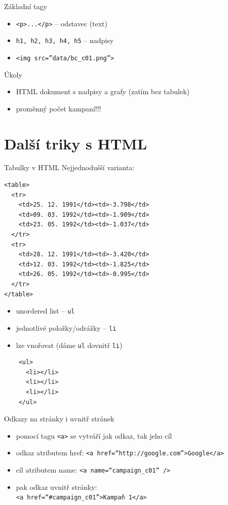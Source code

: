 \documentclass{beamer}
\begin{document}
\begin{frame}[fragile]{Základní tagy}
  \begin{itemize}
    \item \texttt{<p>...</p>} -- odstavec (text)
    \item \texttt{h1, h2, h3, h4, h5} -- nadpisy
    \item \texttt{<img src=''data/bc\_c01.png''>}
  \end{itemize}
\end{frame}

\begin{frame}{Úkoly}
  \begin{itemize}
    \item HTML dokument s nadpisy a grafy (zatím bez tabulek)
    \item proměnný počet kampaní!!!
  \end{itemize}
\end{frame}

\section{Další triky s HTML}

\begin{frame}[fragile]{Tabulky v HTML}
  Nejjednodušší varianta:
  \scriptsize
  \begin{verbatim}
<table>
  <tr>
    <td>25. 12. 1991</td><td>-3.798</td>
    <td>09. 03. 1992</td><td>-1.909</td>
    <td>23. 05. 1992</td><td>-1.037</td>
  </tr>
  <tr>
    <td>28. 12. 1991</td><td>-3.420</td>
    <td>12. 03. 1992</td><td>-1.825</td>
    <td>26. 05. 1992</td><td>-0.995</td>
  </tr>
</table>
  \end{verbatim}
\end{frame}

\begin{frame}[fragile]{}
  \begin{itemize}
    \item unordered list -- \texttt{ul}
    \item jednotlivé položky/odrážky -- \texttt{li}
    \item lze vnořovat (dáme \texttt{ul} dovnitř \texttt{li})
  \end{itemize}
  \begin{verbatim}
    <ul>
      <li></li>
      <li></li>
      <li></li>
    </ul>
  \end{verbatim}
\end{frame}

\begin{frame}[fragile]{Odkazy na stránky i uvnitř stránek}
  \begin{itemize}
    \item pomocí tagu \texttt{<a>} se vytváří jak odkaz, tak jeho cíl
    \item odkaz atributem href: \texttt{<a href=``http://google.com''>Google</a>}
    \item cíl atributem name: \texttt{<a name=``campaign\_c01'' />}
    \item pak odkaz uvnitř stránky: \\ \texttt{<a href=``\#campaign\_c01''>Kampaň 1</a>}
  \end{itemize}
\end{frame}
\end{document}
